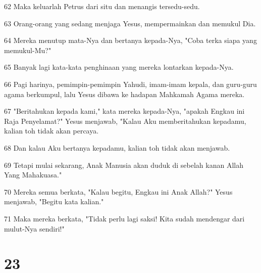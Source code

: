 \par 62 Maka keluarlah Petrus dari situ dan menangis tersedu-sedu.
\par 63 Orang-orang yang sedang menjaga Yesus, mempermainkan dan memukul Dia.
\par 64 Mereka menutup mata-Nya dan bertanya kepada-Nya, "Coba terka siapa yang memukul-Mu?"
\par 65 Banyak lagi kata-kata penghinaan yang mereka lontarkan kepada-Nya.
\par 66 Pagi harinya, pemimpin-pemimpin Yahudi, imam-imam kepala, dan guru-guru agama berkumpul, lalu Yesus dibawa ke hadapan Mahkamah Agama mereka.
\par 67 "Beritahukan kepada kami," kata mereka kepada-Nya, "apakah Engkau ini Raja Penyelamat?" Yesus menjawab, "Kalau Aku memberitahukan kepadamu, kalian toh tidak akan percaya.
\par 68 Dan kalau Aku bertanya kepadamu, kalian toh tidak akan menjawab.
\par 69 Tetapi mulai sekarang, Anak Manusia akan duduk di sebelah kanan Allah Yang Mahakuasa."
\par 70 Mereka semua berkata, "Kalau begitu, Engkau ini Anak Allah?" Yesus menjawab, "Begitu kata kalian."
\par 71 Maka mereka berkata, "Tidak perlu lagi saksi! Kita sudah mendengar dari mulut-Nya sendiri!"

\chapter{23}

